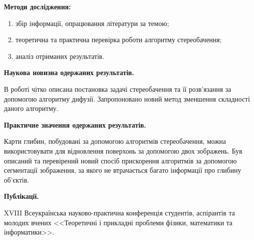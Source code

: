 \textbf{Методи дослідження:}
\begin{enumerate}
    \item збір інформації, опрацювання літератури за темою;
    \item теоретична та практична перевірка роботи алгоритму стереобачення;
    \item аналіз отриманих результатів.
\end{enumerate}

\textbf{Наукова новизна одержаних результатів.}

В роботі чітко описана постановка задачі стереобачення
та її розв'язання за допомогою алгоритму дифузії.
Запропоновано новий метод зменшення складності даного алгоритму.

\textbf{Практичне значення одержаних результатів.}

Карти глибин, побудовані за допомогою алгоритмів стереобачення,
можна використовувати для відновлення поверхонь за допомогою двох зображень.
Був описаний та перевірений
новий спосіб прискорення алгоритмів за допомогою сегментації зображення,
за якого не втрачається багато інформації про глибину об'єктів.

\textbf{Публікації.}

XVIII Всеукраїнська науково-практична конференція студентів,
аспірантів та молодих вчених <<Теоретичні і прикладні проблеми фізики,
математики та інформатики>>.
